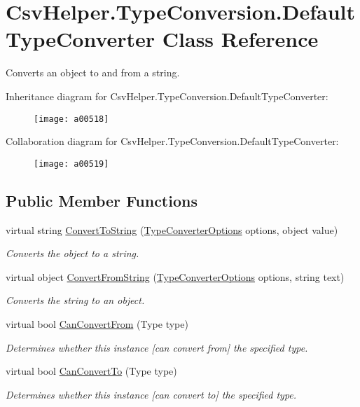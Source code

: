 \hypertarget{a00082}{\section{Csv\-Helper.\-Type\-Conversion.\-Default\-Type\-Converter Class Reference}
\label{a00082}
}


Converts an object to and from a string.  




Inheritance diagram for Csv\-Helper.\-Type\-Conversion.\-Default\-Type\-Converter\-:
\nopagebreak
\begin{figure}[H]
\begin{center}
\leavevmode
\texttt{[image: a00518]}
\end{center}
\end{figure}


Collaboration diagram for Csv\-Helper.\-Type\-Conversion.\-Default\-Type\-Converter\-:
\nopagebreak
\begin{figure}[H]
\begin{center}
\leavevmode
\texttt{[image: a00519]}
\end{center}
\end{figure}
\subsection*{Public Member Functions}
\begin{DoxyCompactItemize}
\item 
virtual string \hyperlink{a00082_a36cb2f9b24f15a671293f3a722324c27}{Convert\-To\-String} (\hyperlink{a00172}{Type\-Converter\-Options} options, object value)
\begin{DoxyCompactList}\small\item\em Converts the object to a string. \end{DoxyCompactList}\item 
virtual object \hyperlink{a00082_a804ea00060e1de70e5151f90d3bfce9b}{Convert\-From\-String} (\hyperlink{a00172}{Type\-Converter\-Options} options, string text)
\begin{DoxyCompactList}\small\item\em Converts the string to an object. \end{DoxyCompactList}\item 
virtual bool \hyperlink{a00082_a470d21adaa704eb281250dbd112ff91a}{Can\-Convert\-From} (Type type)
\begin{DoxyCompactList}\small\item\em Determines whether this instance \mbox{[}can convert from\mbox{]} the specified type. \end{DoxyCompactList}\item 
virtual bool \hyperlink{a00082_acb65bd8c8199d88d5b1629ae35d18514}{Can\-Convert\-To} (Type type)
\begin{DoxyCompactList}\small\item\em Determines whether this instance \mbox{[}can convert to\mbox{]} the specified type. \end{DoxyCompactList}\end{DoxyCompactItemize}


